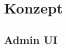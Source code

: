 \section{Konzept}\label{sec:konzept}





\subsection{Admin UI}\label{subsec:admin-ui}

\clearpage


